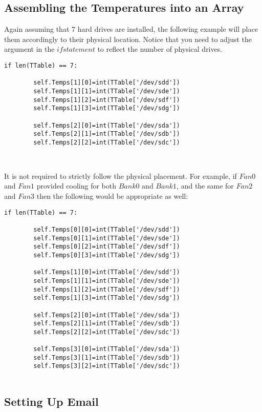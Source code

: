 \documentclass[10pt,letterpaper]{report}
\begin{document}
\subsection{Assembling the Temperatures into an Array}

Again assuming that $7$ hard drives are installed, the following example will place them accordingly to their physical location. Notice that you need to adjust the argument in the $if statement$ to reflect the number of physical drives.

\begin{verbatim}
if len(TTable) == 7:
 
        self.Temps[1][0]=int(TTable['/dev/sdd'])
        self.Temps[1][1]=int(TTable['/dev/sde'])
        self.Temps[1][2]=int(TTable['/dev/sdf'])
        self.Temps[1][3]=int(TTable['/dev/sdg'])
        	        
        self.Temps[2][0]=int(TTable['/dev/sda'])
        self.Temps[2][1]=int(TTable['/dev/sdb'])
        self.Temps[2][2]=int(TTable['/dev/sdc'])

        	        
\end{verbatim}
%
It is not required to strictly follow the physical placement. For example, if $Fan 0$ and $Fan 1$ provided cooling for both $Bank 0$ and $Bank 1$, and the same for $Fan 2$ and $Fan 3$ then the following would be appropriate as well:
%
\begin{verbatim}
if len(TTable) == 7:
 
        self.Temps[0][0]=int(TTable['/dev/sdd'])
        self.Temps[0][1]=int(TTable['/dev/sde'])
        self.Temps[0][2]=int(TTable['/dev/sdf'])
        self.Temps[0][3]=int(TTable['/dev/sdg'])

        self.Temps[1][0]=int(TTable['/dev/sdd'])
        self.Temps[1][1]=int(TTable['/dev/sde'])
        self.Temps[1][2]=int(TTable['/dev/sdf'])
        self.Temps[1][3]=int(TTable['/dev/sdg'])        	        
                	        
        self.Temps[2][0]=int(TTable['/dev/sda'])
        self.Temps[2][1]=int(TTable['/dev/sdb'])
        self.Temps[2][2]=int(TTable['/dev/sdc'])
                	        
        self.Temps[3][0]=int(TTable['/dev/sda'])
        self.Temps[3][1]=int(TTable['/dev/sdb'])
        self.Temps[3][2]=int(TTable['/dev/sdc'])
        	        
\end{verbatim}

\subsection{Setting Up Email}
\end{document}
